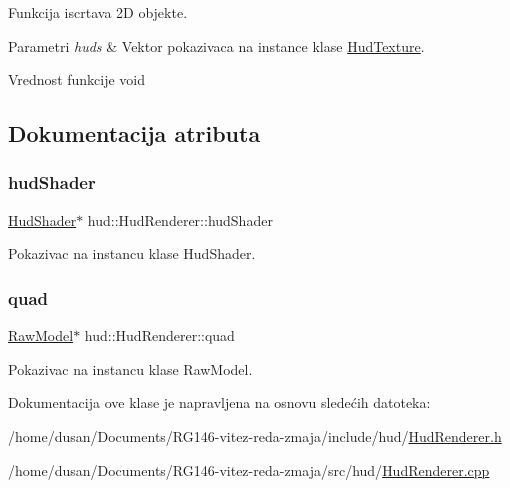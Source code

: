 Funkcija iscrtava 2D objekte. 


\begin{DoxyParams}{Parametri}
{\em huds} & Vektor pokazivaca na instance klase \hyperlink{classhud_1_1HudTexture}{Hud\+Texture}. \\
\hline
\end{DoxyParams}
\begin{DoxyReturn}{Vrednost funkcije}
void 
\end{DoxyReturn}


\subsection{Dokumentacija atributa}
\mbox{\label{classhud_1_1HudRenderer_a6610c7ad17ec6cfdad6c328018030fa2}} 
\subsubsection{\texorpdfstring{hud\+Shader}{hudShader}}
{\footnotesize\ttfamily \hyperlink{classshader_1_1HudShader}{Hud\+Shader}$\ast$ hud\+::\+Hud\+Renderer\+::hud\+Shader\hspace{0.3cm}{\ttfamily [private]}}



Pokazivac na instancu klase Hud\+Shader. 

\mbox{\label{classhud_1_1HudRenderer_a322a5afc38f922fbe0f1a6705f8b34ce}} 
\subsubsection{\texorpdfstring{quad}{quad}}
{\footnotesize\ttfamily \hyperlink{classmodel_1_1RawModel}{Raw\+Model}$\ast$ hud\+::\+Hud\+Renderer\+::quad\hspace{0.3cm}{\ttfamily [private]}}



Pokazivac na instancu klase Raw\+Model. 



Dokumentacija ove klase je napravljena na osnovu sledećih datoteka\+:\begin{DoxyCompactItemize}
\item 
/home/dusan/\+Documents/\+R\+G146-\/vitez-\/reda-\/zmaja/include/hud/\hyperlink{HudRenderer_8h}{Hud\+Renderer.\+h}\item 
/home/dusan/\+Documents/\+R\+G146-\/vitez-\/reda-\/zmaja/src/hud/\hyperlink{HudRenderer_8cpp}{Hud\+Renderer.\+cpp}\end{DoxyCompactItemize}
